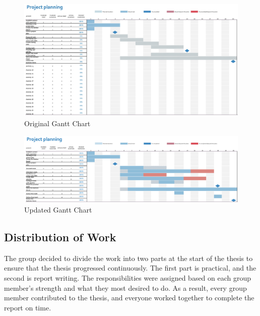 \vspace{2mm}
\begin{figure}[H]
    \centering
    \includegraphics[width=1\columnwidth]{Images/gantt2.jpg}
    \caption{Original Gantt Chart}
    \label{fig: Original Gantt Chart}
\end{figure}

\vspace{2mm}
\begin{figure}[H]
    \centering
    \includegraphics[width=1\columnwidth]{Images/finished-gantt.png}
    \caption{Updated Gantt Chart}
    \label{fig: Updated Gantt Chart}
\end{figure}


\subsection{Distribution of Work}
The group decided to divide the work into two parts at the start of the thesis to ensure that the thesis progressed continuously. The first part is practical, and the second is report writing. The responsibilities were assigned based on each group member's strength and what they most desired to do. As a result, every group member contributed to the thesis, and everyone worked together to complete the report on time. 

